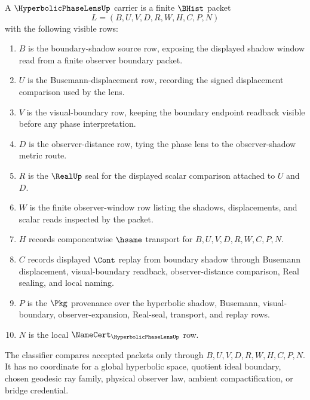 \begin{definition}
\label{def:hyperbolic-phase-lens-carrier}
A $\HyperbolicPhaseLensUp$ carrier is a finite $\BHist$ packet
$$
L=(B,U,V,D,R,W,H,C,P,N)
$$
with the following visible rows:
\begin{enumerate}
\item $B$ is the boundary-shadow source row, exposing the displayed shadow window read from a finite observer boundary packet.
\item $U$ is the Busemann-displacement row, recording the signed displacement comparison used by the lens.
\item $V$ is the visual-boundary row, keeping the boundary endpoint readback visible before any phase interpretation.
\item $D$ is the observer-distance row, tying the phase lens to the observer-shadow metric route.
\item $R$ is the $\RealUp$ seal for the displayed scalar comparison attached to $U$ and $D$.
\item $W$ is the finite observer-window row listing the shadows, displacements, and scalar reads inspected by the packet.
\item $H$ records componentwise $\hsame$ transport for $B,U,V,D,R,W,C,P,N$.
\item $C$ records displayed $\Cont$ replay from boundary shadow through Busemann displacement, visual-boundary readback, observer-distance comparison, Real sealing, and local naming.
\item $P$ is the $\Pkg$ provenance over the hyperbolic shadow, Busemann, visual-boundary, observer-expansion, Real-seal, transport, and replay rows.
\item $N$ is the local $\NameCert_{\HyperbolicPhaseLensUp}$ row.
\end{enumerate}
The classifier compares accepted packets only through $B,U,V,D,R,W,H,C,P,N$. It has no coordinate for a global hyperbolic space, quotient ideal boundary, chosen geodesic ray family, physical observer law, ambient compactification, or bridge credential.
\end{definition}

